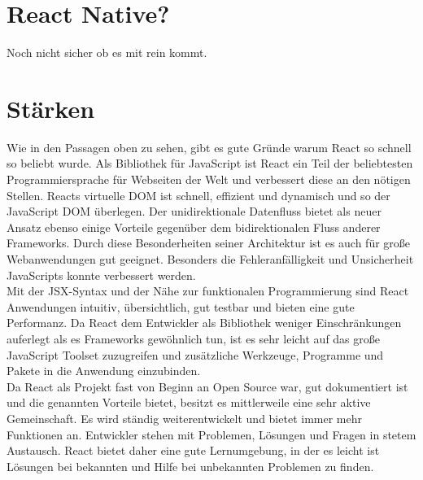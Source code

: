 \section{React Native?}
Noch nicht sicher ob es mit rein kommt.
\section{Stärken}
Wie in den Passagen oben zu sehen, gibt es gute Gründe warum React so schnell so beliebt wurde. Als Bibliothek für JavaScript ist React ein Teil der beliebtesten Programmiersprache für Webseiten der Welt und verbessert diese an den nötigen Stellen. Reacts virtuelle DOM ist schnell, effizient und dynamisch und so der JavaScript DOM überlegen. Der unidirektionale Datenfluss bietet als neuer Ansatz ebenso einige Vorteile gegenüber dem bidirektionalen Fluss anderer Frameworks. Durch diese Besonderheiten seiner Architektur ist es auch für große Webanwendungen gut geeignet. Besonders die Fehleranfälligkeit und Unsicherheit JavaScripts konnte verbessert werden.\\
Mit der JSX-Syntax und der Nähe zur funktionalen Programmierung sind React Anwendungen intuitiv, übersichtlich, gut testbar und bieten eine gute Performanz. Da React dem Entwickler als Bibliothek weniger Einschränkungen auferlegt als es Frameworks gewöhnlich tun, ist es sehr leicht auf das große JavaScript Toolset zuzugreifen und zusätzliche Werkzeuge, Programme und Pakete in die Anwendung einzubinden. \\
Da React als Projekt fast von Beginn an Open Source war, gut dokumentiert ist und die genannten Vorteile bietet, besitzt es mittlerweile eine sehr aktive Gemeinschaft. Es wird ständig weiterentwickelt und bietet immer mehr Funktionen an. Entwickler stehen mit Problemen, Lösungen und Fragen in stetem Austausch. React bietet daher eine gute Lernumgebung, in der es leicht ist Lösungen bei bekannten und Hilfe bei unbekannten Problemen zu finden.\\
